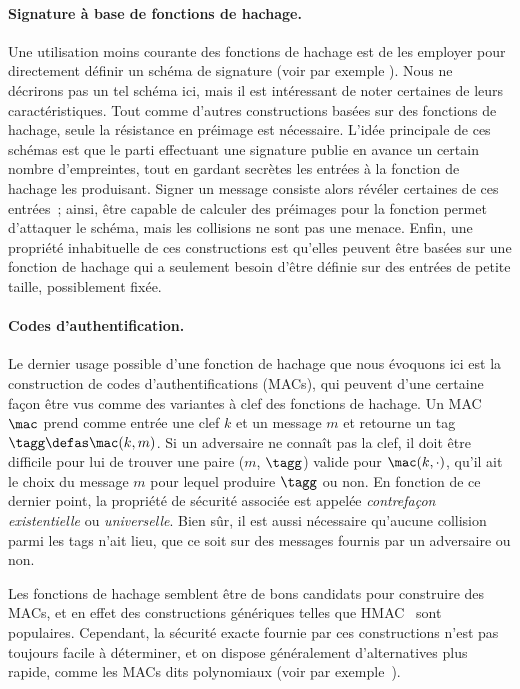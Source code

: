 \paragraph{Signature à base de fonctions de hachage.}
Une utilisation moins courante des fonctions de hachage est de les employer pour directement définir un schéma de signature
(voir par exemple \cite{DBLP:conf/crypto/Merkle87}). Nous ne décrirons pas un tel schéma ici, mais il est intéressant de noter certaines
de leurs caractéristiques.
Tout comme d'autres constructions basées sur des fonctions de hachage, seule la résistance en préimage est nécessaire.
L'idée principale de ces schémas est que le parti effectuant une signature publie en avance un certain nombre d'empreintes, tout en gardant
secrètes les entrées à la fonction de hachage les produisant. Signer un message consiste alors révéler certaines de ces entrées~; ainsi, être capable
de calculer des préimages pour la fonction permet d'attaquer le schéma, mais les collisions ne sont pas une menace.
Enfin, une propriété inhabituelle de ces constructions est qu'elles peuvent être basées sur une fonction de hachage qui a seulement besoin
d'être définie sur des entrées de petite taille, possiblement fixée.

\paragraph{Codes d'authentification.}
Le dernier usage possible d'une fonction de hachage que nous évoquons ici est la construction de codes d'authentifications (MACs),
qui peuvent d'une certaine façon être vus comme des variantes à clef des fonctions de hachage.
Un MAC $\mac$ prend comme entrée une clef $k$ et un message $m$ et retourne un tag
$\tagg \defas \mac(k, m)$.
Si un adversaire ne connaît pas la clef, il doit être difficile pour lui de trouver une paire ($m$, $\tagg$) valide pour
$\mac(k, \cdot)$, qu'il ait le choix du message $m$ pour lequel produire $\tagg$ ou non.
En fonction de ce dernier point, la propriété de sécurité associée est appelée \emph{contrefaçon existentielle} ou \emph{universelle}.
Bien sûr, il est aussi nécessaire qu'aucune collision parmi les tags n'ait lieu, que ce soit sur des messages fournis par un adversaire ou non.

Les fonctions de hachage semblent être de bons candidats pour construire des MACs, et en effet des constructions génériques telles que 
HMAC~\cite{DBLP:conf/crypto/BellareCK96} sont populaires. Cependant, la sécurité exacte fournie par ces constructions n'est pas toujours facile à déterminer,
et on dispose généralement d'alternatives plus rapide, comme les MACs dits polynomiaux
(voir par exemple~\cite{DBLP:conf/crypto/BlackHKKR99}).

